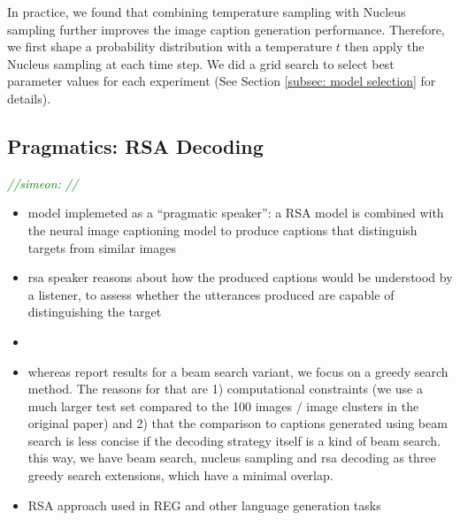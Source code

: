 \documentclass[11pt,a4paper]{article}
\newcommand{\sina}[1]{\textcolor{blue}{\emph{//sina: #1//}}}
\newcommand{\simeon}[1]{\textcolor{green}{\emph{//simeon: #1//}}}
\begin{document}
In practice, we found that combining temperature sampling \cite{ackley1985learning} with Nucleus sampling further improves the image caption generation performance. Therefore, we first shape a probability distribution with a temperature $t$ then apply the Nucleus sampling at each time step. We did a grid search to select best parameter values for each experiment (See Section \ref{subsec: model selection} for details).  


\subsection{Pragmatics: RSA Decoding}
\simeon{}

\begin{itemize}
	\item model implemeted as a \enquote{pragmatic speaker}: a RSA model is combined with the neural image captioning model to produce captions that distinguish targets from similar images
	\item rsa speaker reasons about how the produced captions would be understood by a listener, to assess whether the utterances produced are capable of distinguishing the target
	\item \citet{Cohn-Gordon2018}
	\item whereas \citet{Cohn-Gordon2018} report results for a beam search variant, we focus on a greedy search method. The reasons for that are 1) computational constraints (we use a much larger test set compared to the 100 images / image clusters in the original paper) and 2) that the comparison to captions generated using beam search is less concise if the decoding strategy itself is a kind of beam search. this way, we have beam search, nucleus sampling and rsa decoding as three greedy search extensions, which have a minimal overlap. 
	\item RSA approach used in REG \citep{zarriess-schlangen-2019-know} and other language generation tasks \citep{Shen2019}
\end{itemize}
\end{document}
